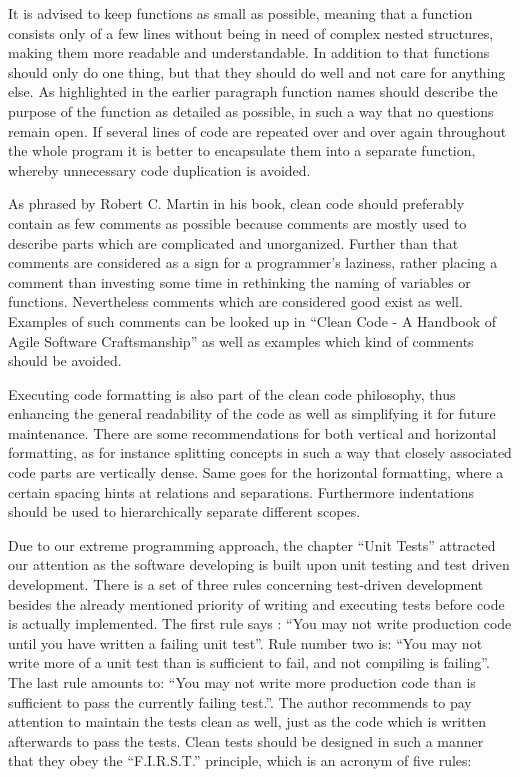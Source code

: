 It is advised to keep functions as small as possible, meaning that a function consists only of a few lines without being in need of complex 
nested structures, making them more readable and understandable. In addition to that functions should only do one thing, but that they should 
do well and not care for anything else. As highlighted in the earlier paragraph function names should describe the purpose of the function as 
detailed as possible, in such a way that no questions remain open. If several lines of code are repeated over and over again throughout the 
whole program it is better to encapsulate them into a separate function, whereby unnecessary  code duplication is avoided.

As phrased by Robert C. Martin in his book, clean code should preferably contain as few comments as possible because comments are mostly used 
to describe parts which are complicated and unorganized. Further than that comments are considered as a sign for a programmer’s laziness, 
rather placing a comment than investing some time in rethinking the naming of variables or functions. Nevertheless comments which are considered 
good exist as well. Examples of such comments can be looked up in “Clean Code - A Handbook of Agile Software Craftsmanship” as well as examples 
which kind of comments should be avoided.

Executing code formatting is also part of the clean code philosophy, thus enhancing the general readability of the code as well as simplifying 
it for future maintenance. There are some recommendations for both vertical and horizontal formatting, as for instance splitting concepts in 
such a way that closely associated code parts are vertically dense. Same goes for the horizontal formatting, where a certain spacing hints at 
relations and separations. Furthermore indentations should be used to hierarchically separate different scopes.

Due to our extreme programming approach, the chapter “Unit Tests” attracted our attention as the software developing is built upon unit testing 
and test driven development. There is a set of three rules concerning test-driven development besides the already mentioned priority of writing 
and executing tests before code is actually implemented. The first rule says : “You may not write production code until you have written a 
failing unit test”. Rule number two is: “You may not write more of a unit test than is sufficient to fail, and not compiling is failing”. The 
last rule amounts to: “You may not write more production code than is sufficient to pass the currently failing test.”. The author recommends to 
pay attention to maintain the tests clean as well, just as the code which is written afterwards to pass the tests. Clean tests should be designed 
in such a manner that they obey the “F.I.R.S.T.” principle, which is an acronym of five rules:

